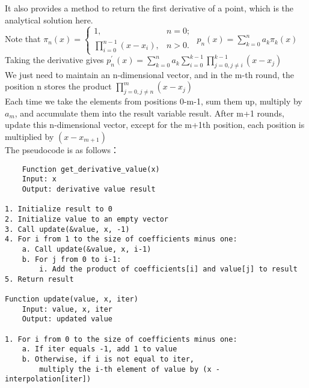 \documentclass[a4paper]{article}
\begin{document}
It also provides a method to return the first derivative of a point, which is the analytical solution here. \\
Note that
\(\pi_n(x) = \begin{cases}
    1, & n = 0; \\
    \prod_{i=0}^{n-1}(x - x_i), & n > 0.
\end{cases}\)
$p_n(x) = \sum_{k=0}^{n} a_k \pi_k(x)$ \\
Taking the derivative gives $p_n^{'}(x) = \sum_{k=0}^{n} a_k\sum_{i=0}^{k-1}\prod_{j=0,j\neq i}^{k-1}(x - x_j)$ \\
We just need to maintain an n-dimensional vector, and in the m-th round, the position n stores the product $\prod_{j=0,j\neq n}^{m}(x - x_j)$ \\
Each time we take the elements from positions 0-m-1, sum them up, multiply by $a_m$, and accumulate them into the result variable result. After m+1 rounds, update this n-dimensional vector, except for the m+1th position, each position is multiplied by $(x-x_{m+1})$ \\
The pseudocode is as follows：
\begin{verbatim}
    Function get_derivative_value(x)
    Input: x
    Output: derivative value result

1. Initialize result to 0
2. Initialize value to an empty vector
3. Call update(&value, x, -1)
4. For i from 1 to the size of coefficients minus one:
    a. Call update(&value, x, i-1)
    b. For j from 0 to i-1:
        i. Add the product of coefficients[i] and value[j] to result
5. Return result

Function update(value, x, iter)
    Input: value, x, iter
    Output: updated value

1. For i from 0 to the size of coefficients minus one:
    a. If iter equals -1, add 1 to value
    b. Otherwise, if i is not equal to iter, 
        multiply the i-th element of value by (x - interpolation[iter])
\end{verbatim}
\end{document}
